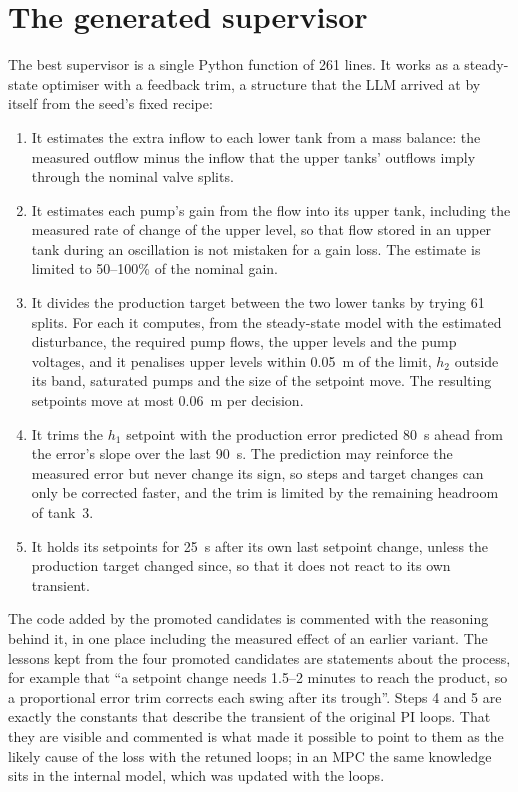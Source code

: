 \section{The generated supervisor}
\label{sec:coord-champion}
The best supervisor is a single Python function of 261 lines. It works as a
steady-state optimiser with a feedback trim, a structure that the LLM arrived
at by itself from the seed's fixed recipe:
\begin{enumerate}
\item It estimates the extra inflow to each lower tank from a mass balance:
  the measured outflow minus the inflow that the upper tanks' outflows imply
  through the nominal valve splits.
\item It estimates each pump's gain from the flow into its upper tank,
  including the measured rate of change of the upper level, so that flow
  stored in an upper tank during an oscillation is not mistaken for a gain
  loss. The estimate is limited to 50--100\% of the nominal gain.
\item It divides the production target between the two lower tanks by
  trying 61 splits. For each it computes, from the steady-state model with
  the estimated disturbance, the required pump flows, the upper levels and
  the pump voltages, and it penalises upper levels within 0.05~m of the limit,
  $h_2$ outside its band, saturated pumps and the size of the setpoint move.
  The resulting setpoints move at most 0.06~m per decision.
\item It trims the $h_1$ setpoint with the production error predicted 80~s
  ahead from the error's slope over the last 90~s. The prediction may
  reinforce the measured error but never change its sign, so steps and target
  changes can only be corrected faster, and the trim is limited by the
  remaining headroom of tank~3.
\item It holds its setpoints for 25~s after its own last setpoint change,
  unless the production target changed since, so that it does not react to
  its own transient.
\end{enumerate}
The code added by the promoted candidates is commented with the reasoning
behind it, in one place including the measured effect of an earlier
variant. The lessons kept from the four promoted candidates are statements
about the process, for example that ``a setpoint change needs 1.5--2 minutes
to reach the product, so a proportional error trim corrects each swing after
its trough''. Steps 4 and 5 are exactly the constants that describe the
transient of the original PI loops. That they are visible and commented is
what made it possible to point to them as the likely cause of the loss with
the retuned loops; in an MPC the same knowledge sits in the internal model,
which was updated with the loops.

